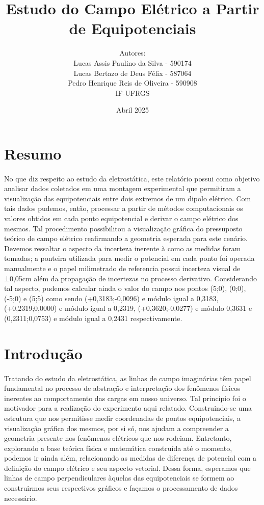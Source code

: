 \documentclass[column,brazilian,12pt,a4paper,final]{article}
\title{Estudo do Campo Elétrico a Partir de Equipotenciais }
\author{Autores: \\ Lucas Assis Paulino da Silva - 590174 \\Lucas Bertazo de Deus Félix - 587064
 \\ Pedro Henrique Reis de Oliveira - 590908 \\ IF-UFRGS}
\date{Abril 2025}
\begin{document}
\maketitle
\thispagestyle{fancy}

\section*{Resumo}
\paragraph{}

No que diz respeito ao estudo da eletrostática, este relatório possui como objetivo analisar dados coletados em uma montagem experimental que permitiram a visualização das equipotenciais entre dois extremos de um dipolo elétrico. Com tais dados pudemos, então, processar a partir de métodos computacionais os valores obtidos em cada ponto equipotencial e derivar o campo elétrico dos mesmos. Tal procedimento possibilitou a visualização gráfica do pressuposto teórico de campo elétrico reafirmando a geometria esperada para este cenário. Devemos ressaltar o aspecto da incerteza inerente à como as medidas foram tomadas; a ponteira utilizada para medir o potencial em cada ponto foi operada manualmente e o papel milimetrado de referencia possui incerteza visual de ±0,05cm além da propagação de incertezas no processo derivativo. Considerando tal aspecto, pudemos calcular ainda o valor do campo nos pontos (5;0), (0;0), (-5;0) e (5;5) como sendo (+0,3183;-0,0096) e módulo igual a 0,3183, (+0,2319;0,0000) e módulo igual a 0,2319, (+0,3620;-0,0277) e módulo 0,3631 e (0,2311;0,0753) e módulo igual a 0,2431 respectivamente. 

\section{Introdução}
\paragraph{}

Tratando do estudo da eletrostática, as linhas de campo imaginárias têm papel fundamental no processo de abstração e interpretação dos fenômenos físicos inerentes ao comportamento das cargas em nosso universo. Tal princípio foi o motivador para a realização do experimento aqui relatado. Construindo-se uma estrutura que nos permitisse medir coordenadas de pontos equipotenciais, a visualização gráfica dos mesmos, por si só, nos ajudam a compreender a geometria presente nos fenômenos elétricos que nos rodeiam. Entretanto, explorando a base teórica física e matemática construída até o momento, podemos ir ainda além, relacionando as medidas de diferença de potencial com a definição do campo elétrico e seu aspecto vetorial. Dessa forma, esperamos que linhas de campo perpendiculares àquelas das equipotenciais se formem ao construirmos seus respectivos gráficos e façamos o processamento de dados necessário.  
\end{document}
